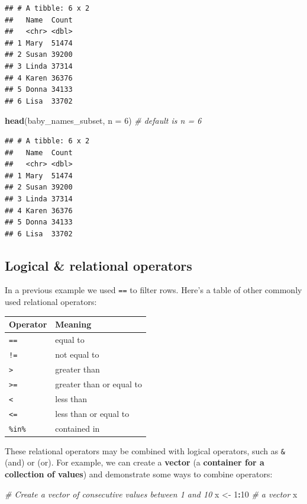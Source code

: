 \documentclass[
]{book}
\newenvironment{Shaded}{\begin{snugshade}}{\end{snugshade}}
\newcommand{\CommentTok}[1]{\textcolor[rgb]{0.56,0.35,0.01}{\textit{#1}}}
\newcommand{\DataTypeTok}[1]{\textcolor[rgb]{0.13,0.29,0.53}{#1}}
\newcommand{\DecValTok}[1]{\textcolor[rgb]{0.00,0.00,0.81}{#1}}
\newcommand{\KeywordTok}[1]{\textcolor[rgb]{0.13,0.29,0.53}{\textbf{#1}}}
\newcommand{\NormalTok}[1]{#1}
\newcommand{\OperatorTok}[1]{\textcolor[rgb]{0.81,0.36,0.00}{\textbf{#1}}}
\newcommand{\StringTok}[1]{\textcolor[rgb]{0.31,0.60,0.02}{#1}}
\begin{document}
\begin{verbatim}
## # A tibble: 6 x 2
##   Name  Count
##   <chr> <dbl>
## 1 Mary  51474
## 2 Susan 39200
## 3 Linda 37314
## 4 Karen 36376
## 5 Donna 34133
## 6 Lisa  33702
\end{verbatim}

\begin{Shaded}
\begin{Highlighting}[]
\KeywordTok{head}\NormalTok{(baby\_names\_subset, }\DataTypeTok{n =} \DecValTok{6}\NormalTok{) }\CommentTok{\# default is n = 6}
\end{Highlighting}
\end{Shaded}

\begin{verbatim}
## # A tibble: 6 x 2
##   Name  Count
##   <chr> <dbl>
## 1 Mary  51474
## 2 Susan 39200
## 3 Linda 37314
## 4 Karen 36376
## 5 Donna 34133
## 6 Lisa  33702
\end{verbatim}

\hypertarget{logical-relational-operators}{%
\subsection{Logical \& relational operators}\label{logical-relational-operators}}

In a previous example we used \texttt{==} to filter rows.
Here's a table of other commonly used relational operators:

\begin{longtable}[]{@{}ll@{}}
\toprule
Operator & Meaning\tabularnewline
\midrule
\endhead
\texttt{==} & equal to\tabularnewline
\texttt{!=} & not equal to\tabularnewline
\texttt{\textgreater{}} & greater than\tabularnewline
\texttt{\textgreater{}=} & greater than or equal to\tabularnewline
\texttt{\textless{}} & less than\tabularnewline
\texttt{\textless{}=} & less than or equal to\tabularnewline
\texttt{\%in\%} & contained in\tabularnewline
\bottomrule
\end{longtable}

These relational operators may be combined with logical operators, such as \texttt{\&} (and) or \texttt{\textbar{}} (or).
For example, we can create a \textbf{vector} (a \textbf{container for a collection of values}) and demonstrate
some ways to combine operators:

\begin{Shaded}
\begin{Highlighting}[]
\CommentTok{\# Create a vector of consecutive values between 1 and 10}
\NormalTok{x \textless{}{-}}\StringTok{ }\DecValTok{1}\OperatorTok{:}\DecValTok{10} \CommentTok{\# a vector}
\NormalTok{x}
\end{Highlighting}
\end{Shaded}
\end{document}
